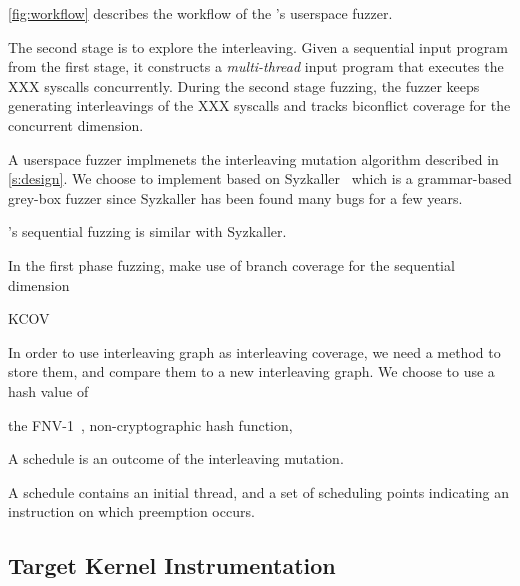 \autoref{fig:workflow} describes the workflow of the \sys's userspace
fuzzer.
%


%
The second stage is to explore the interleaving. Given a sequential
input program from the first stage, it constructs a
\textit{multi-thread} input program that executes the XXX syscalls
concurrently.
%
During the second stage fuzzing, the fuzzer keeps generating
interleavings of the XXX syscalls and tracks biconflict coverage for
the concurrent dimension.




A userspace fuzzer implmenets the interleaving mutation algorithm
described in \autoref{s:design}.
%
We choose to implement \sys based on Syzkaller~\cite{syzkaller} which
is a grammar-based grey-box fuzzer since Syzkaller has been found many
bugs for a few years.
%

%
\sys's sequential fuzzing is similar with Syzkaller.

In the first phase fuzzing, \sys make use of branch coverage for the
sequential dimension


KCOV~\cite{kcov}


%
In order to use interleaving graph as interleaving coverage, we need a
method to store them, and compare them to a new interleaving graph.
%
We choose to use a hash value of

the FNV-1~\cite{fnv, fnv-go}, non-cryptographic hash function,


A schedule is an outcome of the interleaving mutation.

A schedule contains an initial thread, and a set of scheduling points
indicating an instruction on which preemption occurs.


\subsection{Target Kernel Instrumentation}
\label{ss:instrumentation}

